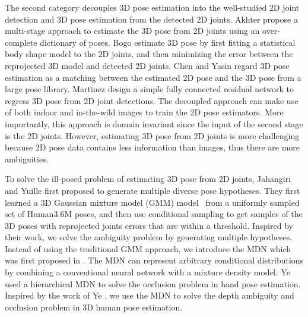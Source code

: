 \documentclass[10pt,twocolumn,letterpaper]{article}
\begin{document}
The second category \cite{akhter2015pose,zhou2016sparseness, bogo2016keep,martinez2017simple,hossain2018exploiting, chen2016synthesizing,yasin2016dual, moreno20173d} decouples 3D pose estimation into the well-studied 2D joint detection \cite{newell2016stacked, wei2016convolutional} and 3D pose estimation from the detected 2D joints. Akhter \etal \cite{akhter2015pose} propose a multi-stage approach to estimate the 3D pose from 2D joints using an over-complete dictionary of poses. Bogo \etal \cite{bogo2016keep} estimate 3D pose by first fitting a statistical body shape model to the 2D joints, and then minimizing the error between the reprojected 3D model and detected 2D joints. Chen \cite{chen2016synthesizing} and Yasin \cite{yasin2016dual} regard 3D pose estimation as a matching between the estimated 2D pose and the 3D pose from a large pose library. Martinez \etal\cite{martinez2017simple} design a simple fully connected residual network to regress 3D pose from 2D joint detections. The decoupled approach can make use of both indoor and in-the-wild images to train the 2D pose estimators. More importantly, this approach is domain invariant since the input of the second stage is the 2D joints. However, estimating 3D pose from 2D joints is more challenging because 2D pose data contains less information than images, thus there are more ambiguities. 



To solve the ill-posed problem of estimating 3D pose from 2D joints, Jahangiri and Yuille \cite{jahangiri2017generating} first proposed to generate multiple diverse pose hypotheses. They first learned a 3D Gaussian mixture model (GMM) model~\cite{sigal2004tracking} from a uniformly sampled set of Human3.6M poses, and then use conditional sampling to get samples of the 3D poses with reprojected joints errors that are within a threshold. Inspired by their work, we solve the ambiguity problem by generating multiple hypotheses. Instead of using the traditional GMM approach, we introduce the MDN which was first proposed in \cite{bishop1994mixture}. The MDN can represent arbitrary conditional distributions by combining a conventional neural network with a mixture density model. Ye \etal \cite{ye2017occlusion} used a hierarchical MDN to solve the occlusion problem in hand pose estimation. Inspired by the work of Ye \etal, we use the MDN to solve the depth ambiguity and occlusion problem in 3D human pose estimation. 
\vspace{-1mm}
\end{document}
